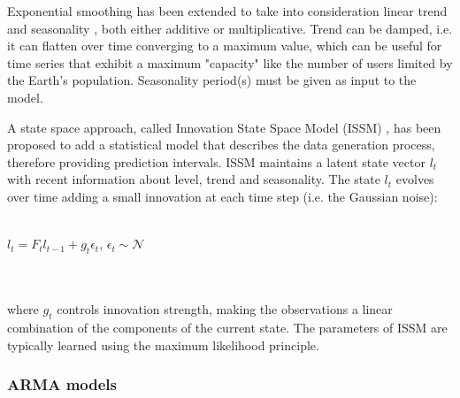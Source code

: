 \documentclass[a4paper]{article} %
\begin{document}
	
	Exponential smoothing has been extended to take into consideration linear trend and seasonality \cite{ExponentialSmoothingHoltCharles}, both either additive or multiplicative. Trend can be damped, i.e. it can flatten over time converging to a maximum value, which can be useful for time series that exhibit a maximum "capacity" like the number of users limited by the Earth's population. 
	Seasonality period(s) must be given as input to the model.
	
	A state space approach, called Innovation State Space Model (ISSM) \cite{ExponentialSmoothingStateSpace}, has been proposed to add a statistical model that describes the data generation process, therefore providing prediction intervals. ISSM maintains a latent state vector $l_t$ with recent information about level, trend and seasonality. The state $l_t$ evolves over time adding a small innovation at each time step (i.e. the Gaussian noise):\\\\
	\centerline{$l_t = F_t l_{t-1} + g_t \epsilon_t$, $\epsilon_t \sim \mathcal{N}$}\\\\
	where $g_t$ controls innovation strength, making the observations a linear combination of the components of the current state. The parameters of ISSM are typically learned using the maximum likelihood principle.
	
	
	
	\subsubsection{ARMA models} \label{sssec:arma}
	
\end{document}
